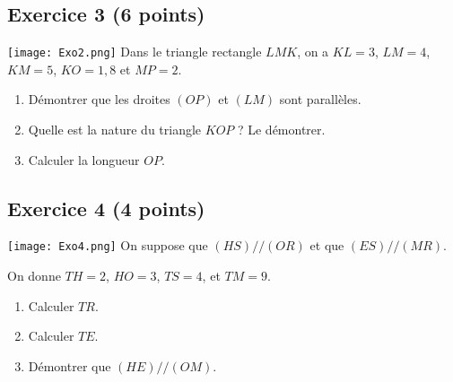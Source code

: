 \documentclass[14 pt]{extarticle}
\theoremstyle{plain}
\begin{document}
 \subsection*{Exercice 3 (6 points)}
 
 \texttt{[image: Exo2.png]}\newline
Dans le triangle rectangle $LMK$, on a $KL = 3$, $LM= 4$, $KM=5$, $KO= 1,8$ et $MP= 2$. \begin{enumerate}
\item 
 Démontrer que les droites $(OP)$ et $(LM)$ sont parallèles. 
 \item Quelle est la nature du triangle $KOP$ ? Le démontrer.
 \item 
 Calculer la longueur $OP$. 
\end{enumerate}

 
 \subsection*{Exercice 4 (4 points)}
 
 \texttt{[image: Exo4.png]}\newline
 On suppose que $(HS)//(OR)$ et que $(ES)//(MR)$. 
 
 On donne $TH = 2$, $HO = 3$, $TS= 4$, et $TM= 9$. 
 
 \begin{enumerate}
 \item Calculer $TR$. 
 \item Calculer $TE$.  
 \item Démontrer que $(HE)//(OM)$. 
 \end{enumerate}
 

 	
\end{document}
